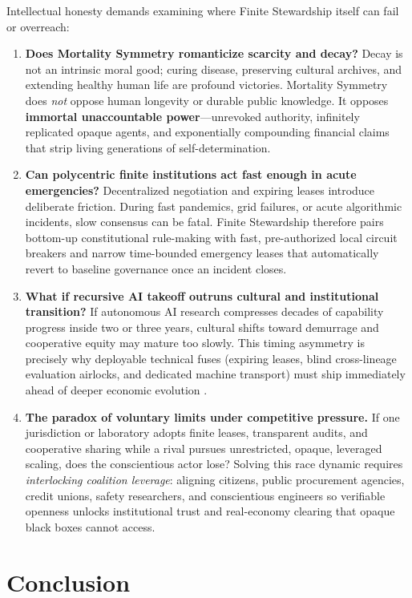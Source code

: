 \documentclass[11pt]{article}
\begin{document}
Intellectual honesty demands examining where Finite Stewardship itself can fail or overreach:
\begin{enumerate}
  \item \textbf{Does Mortality Symmetry romanticize scarcity and decay?} Decay is not an intrinsic moral good; curing disease, preserving cultural archives, and extending healthy human life are profound victories. Mortality Symmetry does \emph{not} oppose human longevity or durable public knowledge. It opposes \textbf{immortal unaccountable power}---unrevoked authority, infinitely replicated opaque agents, and exponentially compounding financial claims that strip living generations of self-determination.
  \item \textbf{Can polycentric finite institutions act fast enough in acute emergencies?} Decentralized negotiation and expiring leases introduce deliberate friction. During fast pandemics, grid failures, or acute algorithmic incidents, slow consensus can be fatal. Finite Stewardship therefore pairs bottom-up constitutional rule-making with fast, pre-authorized local circuit breakers and narrow time-bounded emergency leases that automatically revert to baseline governance once an incident closes.
  \item \textbf{What if recursive AI takeoff outruns cultural and institutional transition?} If autonomous AI research compresses decades of capability progress inside two or three years, cultural shifts toward demurrage and cooperative equity may mature too slowly. This timing asymmetry is precisely why deployable technical fuses (expiring leases, blind cross-lineage evaluation airlocks, and dedicated machine transport) must ship immediately ahead of deeper economic evolution \citep{baker2026cin}.
  \item \textbf{The paradox of voluntary limits under competitive pressure.} If one jurisdiction or laboratory adopts finite leases, transparent audits, and cooperative sharing while a rival pursues unrestricted, opaque, leveraged scaling, does the conscientious actor lose? Solving this race dynamic requires \emph{interlocking coalition leverage}: aligning citizens, public procurement agencies, credit unions, safety researchers, and conscientious engineers so verifiable openness unlocks institutional trust and real-economy clearing that opaque black boxes cannot access.
\end{enumerate}

\section{Conclusion}\label{sec:conclusion}
\end{document}

